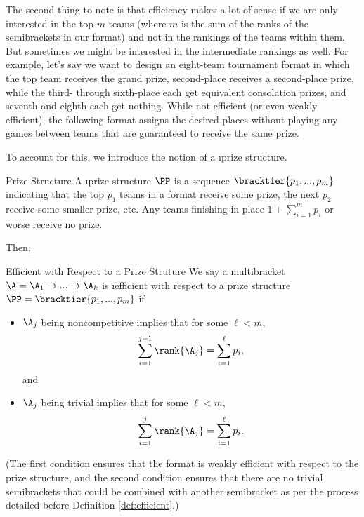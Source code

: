 {    The second thing to note is that efficiency makes a lot of sense if we are only interested in the top-$m$ teams (where $m$ is the sum of the ranks of the semibrackets in our format) and not in the rankings of the teams within them. But sometimes we might be interested in the intermediate rankings as well. For example, let's say we want to design an eight-team tournament format in which the top team receives the grand prize, second-place receives a second-place prize, while the third- through sixth-place each get equivalent consolation prizes, and seventh and eighth each get nothing. While not efficient (or even weakly efficient), the following format assigns the desired places without playing any games between teams that are guaranteed to receive the same prize.


    To account for this, we introduce the notion of a \i{prize structure}.
    
    \begin{definition}{Prize Structure}{}
        A \i{prize structure} $\PP$ is a sequence $\bracktier{p_1, ..., p_m}$ indicating that the top $p_1$ teams in a format receive some prize, the next $p_2$ receive some smaller prize, etc. Any teams finishing in place $1 + \sum_{i=1}^m p_i$ or worse receive no prize.
    \end{definition}

    Then,

    \begin{definition}{Efficient with Respect to a Prize Struture}{}
        We say a multibracket $\A = \A_1 \to ... \to \A_k$ is \i{efficient with respect to a prize structure} $\PP = \bracktier{p_1, ..., p_m}$ if
        \begin{itemize}
            \item $\A_j$ being noncompetitive implies that for some $\ell < m$, $$\sum_{i=1}^{j-1} \rank {\A_j} = \sum_{i=1}^\ell p_i,$$
                         and
            \item $\A_j$ being trivial implies that for some $\ell < m$, $$\sum_{i=1}^{j} \rank {\A_j} = \sum_{i=1}^\ell p_i.$$
        \end{itemize}
    \end{definition}

    (The first condition ensures that the format is weakly efficient with respect to the prize structure, and the second condition ensures that there are no trivial semibrackets that could be combined with another semibracket as per the process detailed before Definition \ref{def:efficient}.)

}
